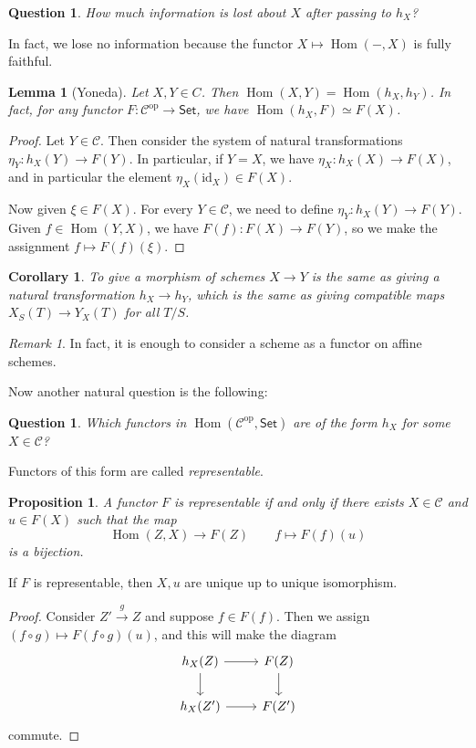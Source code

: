 \documentclass[leqno, openany]{memoir}
\newtheorem{cor}[thm]{Corollary}
\newtheorem{prop}[thm]{Proposition}
\newtheorem{lem}[thm]{Lemma}
\newtheorem{quest}[thm]{Question}
\theoremstyle{definition}
\theoremstyle{remark}
\newtheorem{rmk}[thm]{Remark}
\theoremstyle{plain}
\theoremstyle{definition}
\theoremstyle{remark}
\newcommand{\mc}[1]{\mathcal{#1}}
\newcommand{\mr}[1]{\mathrm{#1}}
\newcommand{\ms}[1]{\mathsf{#1}}
\renewcommand{\op}{\mathrm{op}}
\DeclareMathOperator{\Hom}{Hom}
\begin{document}
\begin{quest}
    How much information is lost about $X$ after passing to $h_X$?
\end{quest}
In fact, we lose no information because the functor $X \mapsto \Hom(-,X)$ is fully faithful.
\begin{lem}[Yoneda]
    Let $X,Y \in C$. Then $\Hom(X,Y) = \Hom(h_X, h_Y)$. In fact, for any functor $F \colon \mc{C}^{\op} \to \ms{Set}$, we have $\Hom(h_X, F) \simeq F(X)$.
\end{lem}

\begin{proof}
    Let $Y \in \mc{C}$. Then consider the system of natural transformations $\eta_Y \colon h_X(Y) \to F(Y)$. In particular, if $Y = X$, we have $\eta_X \colon h_X(X) \to F(X)$, and in particular the element $\eta_X(\mr{id}_X) \in F(X)$.

    Now given $\xi \in F(X)$. For every $Y \in \mc{C}$, we need to define $\eta_Y \colon h_X(Y) \to F(Y)$. Given $f \in \Hom(Y,X)$, we have $F(f) \colon F(X) \to F(Y)$, so we make the assignment $f \mapsto F(f)(\xi)$.
\end{proof}

\begin{cor}
    To give a morphism of schemes $X \to Y$ is the same as giving a natural transformation $h_X \to h_Y$, which is the same as giving compatible maps $X_S(T) \to Y_X(T)$ for all $T/S$.
\end{cor}

\begin{rmk}
    In fact, it is enough to consider a scheme as a functor on affine schemes. 
\end{rmk}

Now another natural question is the following:
\begin{quest}
    Which functors in $\Hom(\mc{C}^{\op}, \ms{Set})$ are of the form $h_X$ for some $X \in \mc{C}$?
\end{quest}
Functors of this form are called \textit{representable}.
\begin{prop}
    A functor $F$ is representable if and only if there exists $X \in \mc{C}$ and $u \in F(X)$ such that the map 
    \[ \Hom(Z,X) \to F(Z) \qquad f \mapsto F(f)(u) \]
    is a bijection.
\end{prop}
If $F$ is representable, then $X,u$ are unique up to unique isomorphism.
\begin{proof}
    Consider $Z' \xrightarrow{g} Z$ and suppose $f \in F(f)$. Then we assign $(f \circ g) \mapsto F(f \circ g)(u)$, and this will make the diagram
    \begin{equation*}
    \begin{tikzcd}
        h_X(Z) \arrow{r} \arrow{d} & F(Z) \arrow{d} \\
        h_X(Z') \arrow{r} & F(Z')
    \end{tikzcd}
    \end{equation*}
    commute.
\end{proof}
\end{document}
